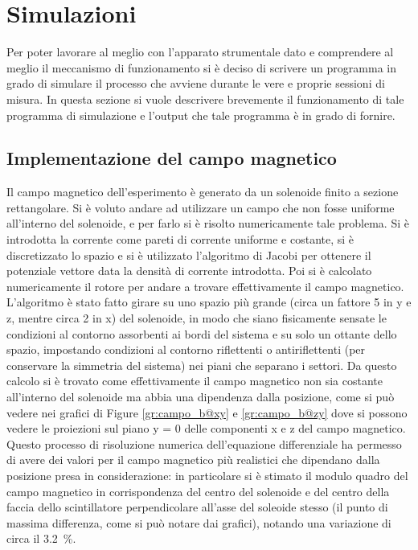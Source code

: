 \section{Simulazioni}
Per poter lavorare al meglio con l'apparato strumentale dato e comprendere al meglio il meccanismo di funzionamento si è deciso di scrivere un programma in grado di simulare
il processo che avviene durante le vere e proprie sessioni di misura. In questa sezione si vuole descrivere brevemente il funzionamento di tale programma di simulazione e
l'output che tale programma è in grado di fornire.







\subsection{Implementazione del campo magnetico}
Il campo magnetico dell'esperimento è generato da un solenoide finito a sezione rettangolare. 
Si è voluto andare ad utilizzare un campo che non fosse uniforme all'interno del solenoide, e per farlo si è risolto numericamente tale problema. 
Si è introdotta la corrente come pareti di corrente uniforme e costante, si è discretizzato lo spazio e si è utilizzato l'algoritmo di Jacobi per ottenere il potenziale vettore data la densità di corrente introdotta. 
Poi si è calcolato numericamente il rotore per andare a trovare effettivamente il campo magnetico. 
L'algoritmo è stato fatto girare su uno spazio più grande (circa un fattore 5 in y e z, mentre circa 2 in x) del solenoide, in modo che siano fisicamente sensate le condizioni al contorno assorbenti ai bordi del sistema e su solo un ottante dello spazio, impostando condizioni al contorno riflettenti o antiriflettenti (per conservare la simmetria del sistema) nei piani che separano i settori. Da questo calcolo si è trovato come effettivamente il campo magnetico non sia costante all'interno del solenoide ma abbia una dipendenza dalla posizione, come si può vedere nei grafici di Figure \ref{gr:campo_b@xy} e \ref{gr:campo_b@zy} dove si possono vedere le proiezioni sul piano y = 0 delle componenti x e z del campo magnetico. 
Questo processo di risoluzione numerica dell'equazione differenziale ha permesso di avere dei valori per il campo magnetico più realistici che dipendano dalla posizione presa in considerazione: in particolare si \`e stimato il modulo quadro del campo magnetico in corrispondenza del centro del solenoide e del centro della faccia dello scintillatore perpendicolare all'asse del soleoide stesso (il punto di massima differenza, come si pu\`o notare dai grafici), notando una variazione di circa il \SI{3.2}{\percent}. 

